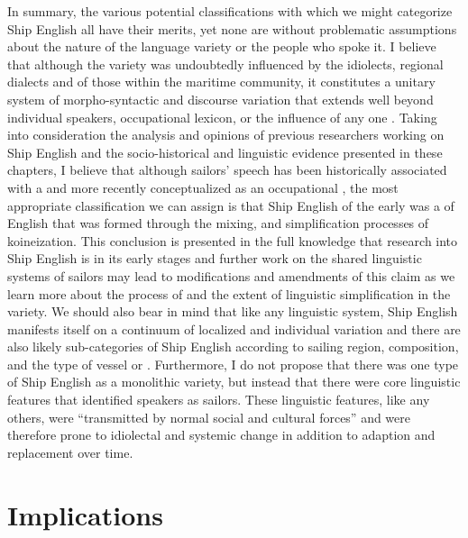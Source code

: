 In summary, the various potential classifications with which we might categorize Ship English all have their merits, yet none are without problematic assumptions about the nature of the language variety or the people who spoke it. I believe that although the variety was undoubtedly influenced by the idiolects, regional dialects and  of those within the maritime community, it constitutes a unitary system of morpho-syntactic and discourse variation that extends well beyond individual speakers, occupational lexicon, or the influence of any one . Taking into consideration the analysis and opinions of previous researchers working on Ship English and the socio-historical and linguistic evidence presented in these chapters, I believe that although sailors’ speech has been historically associated with a  and more recently conceptualized as an occupational , the most appropriate classification we can assign is that Ship English of the early  was a  of English that was formed through the mixing,  and simplification processes of koineization. This conclusion is presented in the full knowledge that research into Ship English is in its early stages and further work on the shared linguistic systems of sailors may lead to modifications and amendments of this claim as we learn more about the process of  and the extent of linguistic simplification in the variety. We should also bear in mind that like any linguistic system, Ship English manifests itself on a continuum of localized and individual variation and there are also likely sub-categories of Ship English according to sailing region,  composition, and the type of vessel or . Furthermore, I do not propose that there was one type of Ship English as a monolithic variety, but instead that there were core linguistic features that identified speakers as sailors. These linguistic features, like any others, were “transmitted by normal social and cultural forces” \citep[129]{McDavid1979} and were therefore prone to idiolectal and systemic change in addition to adaption and replacement over time.

\section{{Implications}}%

